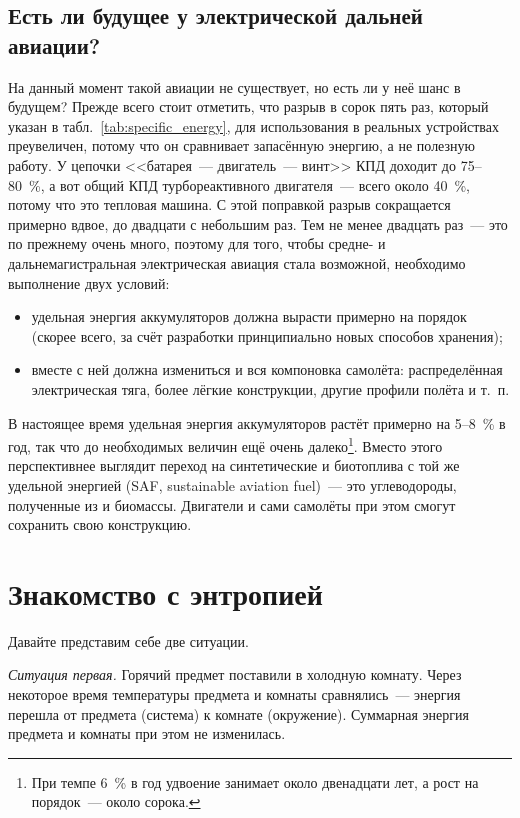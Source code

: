 \subsection*{Есть ли будущее у электрической дальней авиации?}

На данный момент такой авиации не существует, но есть ли у неё шанс в будущем? Прежде всего стоит отметить, что разрыв в сорок пять раз, который указан в табл.~\ref{tab:specific_energy}, для использования в реальных устройствах преувеличен, потому что он сравнивает запасённую энергию, а не полезную работу. У цепочки <<батарея~--- двигатель~--- винт>> КПД доходит до \num{75}--\qty{80}{\percent}, а вот общий КПД турбореактивного двигателя~--- всего около \qty{40}{\percent}, потому что это тепловая машина. С этой поправкой разрыв сокращается примерно вдвое, до двадцати с небольшим раз. Тем не менее двадцать раз~--- это по прежнему очень много, поэтому для того, чтобы средне- и дальнемагистральная электрическая авиация стала возможной, необходимо выполнение двух условий:

\begin{itemize}
    \item удельная энергия аккумуляторов должна вырасти примерно на порядок (скорее всего, за счёт разработки принципиально новых способов хранения);
    \item вместе с ней должна измениться и вся компоновка самолёта: распределённая электрическая тяга, более лёгкие конструкции, другие профили полёта и т.~п.
\end{itemize}

В настоящее время удельная энергия аккумуляторов растёт примерно на \num{5}--\qty{8}{\percent} в год, так что до необходимых величин ещё очень далеко\footnote{При темпе \qty{6}{\percent} в год удвоение занимает около двенадцати лет, а рост на порядок~--- около сорока.}. Вместо этого перспективнее выглядит переход на синтетические и биотоплива с той же удельной энергией (SAF, sustainable aviation fuel)~--- это углеводороды, полученные из  и биомассы. Двигатели и сами самолёты при этом смогут сохранить свою конструкцию.

\clearpage

\section{Знакомство с энтропией}

Давайте представим себе две ситуации.

\emph{Ситуация первая.} Горячий предмет поставили в холодную комнату. Через некоторое время температуры предмета и комнаты сравнялись~--- энергия перешла от предмета (система) к комнате (окружение). Суммарная энергия предмета и комнаты при этом не изменилась.

